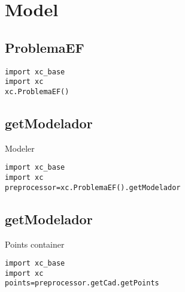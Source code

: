 \chapter{Model}


\section{ProblemaEF}
\begin{verbatim}
import xc_base
import xc
xc.ProblemaEF()
\end{verbatim}

\section{getModelador}\label{getModelador}
Modeler
\begin{verbatim}
import xc_base
import xc
preprocessor=xc.ProblemaEF().getModelador
\end{verbatim}

\section{getModelador}\label{getModelador}
Points container
\begin{verbatim}
import xc_base
import xc
points=preprocessor.getCad.getPoints
\end{verbatim}

